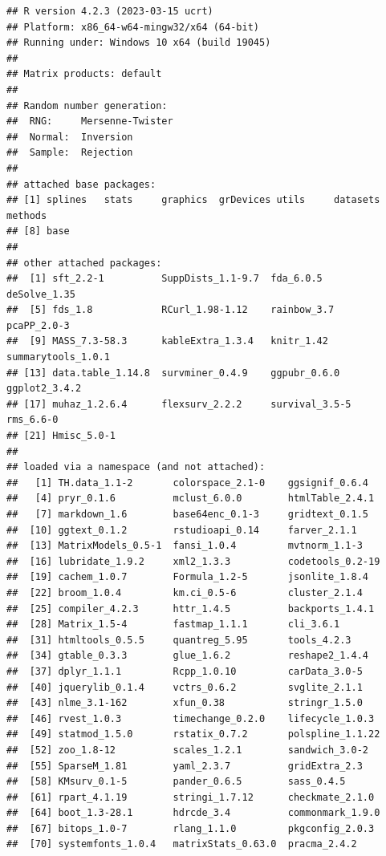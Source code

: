 \documentclass[
]{article}
\begin{document}
\begin{verbatim}
## R version 4.2.3 (2023-03-15 ucrt)
## Platform: x86_64-w64-mingw32/x64 (64-bit)
## Running under: Windows 10 x64 (build 19045)
## 
## Matrix products: default
## 
## Random number generation:
##  RNG:     Mersenne-Twister 
##  Normal:  Inversion 
##  Sample:  Rejection 
##  
## attached base packages:
## [1] splines   stats     graphics  grDevices utils     datasets  methods  
## [8] base     
## 
## other attached packages:
##  [1] sft_2.2-1          SuppDists_1.1-9.7  fda_6.0.5          deSolve_1.35      
##  [5] fds_1.8            RCurl_1.98-1.12    rainbow_3.7        pcaPP_2.0-3       
##  [9] MASS_7.3-58.3      kableExtra_1.3.4   knitr_1.42         summarytools_1.0.1
## [13] data.table_1.14.8  survminer_0.4.9    ggpubr_0.6.0       ggplot2_3.4.2     
## [17] muhaz_1.2.6.4      flexsurv_2.2.2     survival_3.5-5     rms_6.6-0         
## [21] Hmisc_5.0-1       
## 
## loaded via a namespace (and not attached):
##   [1] TH.data_1.1-2       colorspace_2.1-0    ggsignif_0.6.4     
##   [4] pryr_0.1.6          mclust_6.0.0        htmlTable_2.4.1    
##   [7] markdown_1.6        base64enc_0.1-3     gridtext_0.1.5     
##  [10] ggtext_0.1.2        rstudioapi_0.14     farver_2.1.1       
##  [13] MatrixModels_0.5-1  fansi_1.0.4         mvtnorm_1.1-3      
##  [16] lubridate_1.9.2     xml2_1.3.3          codetools_0.2-19   
##  [19] cachem_1.0.7        Formula_1.2-5       jsonlite_1.8.4     
##  [22] broom_1.0.4         km.ci_0.5-6         cluster_2.1.4      
##  [25] compiler_4.2.3      httr_1.4.5          backports_1.4.1    
##  [28] Matrix_1.5-4        fastmap_1.1.1       cli_3.6.1          
##  [31] htmltools_0.5.5     quantreg_5.95       tools_4.2.3        
##  [34] gtable_0.3.3        glue_1.6.2          reshape2_1.4.4     
##  [37] dplyr_1.1.1         Rcpp_1.0.10         carData_3.0-5      
##  [40] jquerylib_0.1.4     vctrs_0.6.2         svglite_2.1.1      
##  [43] nlme_3.1-162        xfun_0.38           stringr_1.5.0      
##  [46] rvest_1.0.3         timechange_0.2.0    lifecycle_1.0.3    
##  [49] statmod_1.5.0       rstatix_0.7.2       polspline_1.1.22   
##  [52] zoo_1.8-12          scales_1.2.1        sandwich_3.0-2     
##  [55] SparseM_1.81        yaml_2.3.7          gridExtra_2.3      
##  [58] KMsurv_0.1-5        pander_0.6.5        sass_0.4.5         
##  [61] rpart_4.1.19        stringi_1.7.12      checkmate_2.1.0    
##  [64] boot_1.3-28.1       hdrcde_3.4          commonmark_1.9.0   
##  [67] bitops_1.0-7        rlang_1.1.0         pkgconfig_2.0.3    
##  [70] systemfonts_1.0.4   matrixStats_0.63.0  pracma_2.4.2       

\end{verbatim}
\end{document}
